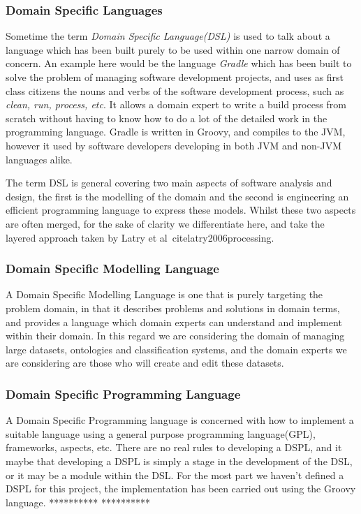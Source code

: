 \documentclass{llncs}
\begin{document}
\subsubsection{Domain Specific Languages}
Sometime the term \emph{Domain Specific Language(DSL)} is used to talk about a language which has been built purely to be used within one narrow domain of concern. An example here would be the language \emph{Gradle} which has been built to solve the problem of managing software development projects, and uses as first class citizens the nouns and verbs of the software development process, such as \emph{clean, run, process, etc}. It allows a domain expert to write a build process from scratch without having to know how to do a lot of the detailed work in the programming language. Gradle is written in Groovy, and compiles to the JVM, however it used by software developers developing in both JVM and non-JVM languages alike.

The term DSL is general covering two main aspects of software analysis and design, the first is the modelling of the domain and the second is engineering an efficient programming language to express these models. Whilst these two aspects are often merged, for the sake of clarity we differentiate here, and take the layered approach taken by Latry et al~cite{latry2006processing}.
 

\subsubsection{Domain Specific Modelling Language}

A Domain Specific Modelling Language is one that is purely targeting the problem domain, in that it describes problems and solutions in domain terms, and provides a language which domain experts can understand and implement within their domain. In this regard we are considering the domain of managing large datasets, ontologies and classification systems, and the domain experts we are considering are those who will create and edit these datasets. 

\subsubsection{Domain Specific Programming Language}	
A Domain Specific Programming language is concerned with how to implement a suitable language using a general purpose programming language(GPL), frameworks, aspects, etc. There are no real rules to developing a DSPL, and it maybe that developing a DSPL is simply a stage in the development of the DSL, or it may be a module within the DSL. For the most part we haven't defined a DSPL for this project, the implementation has been carried out using the Groovy language. 
**********
**********
\end{document}

